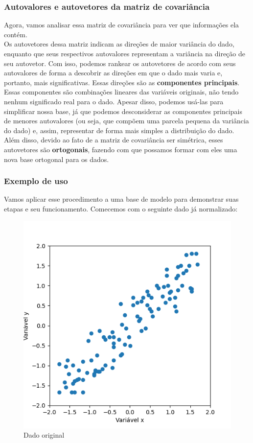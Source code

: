 \documentclass{article}
\begin{document}
\subsubsection{Autovalores e autovetores da matriz de covariância}

Agora, vamos analisar essa matriz de covariância para ver que informações ela contém. \\

Os autovetores dessa matriz indicam as direções de maior variância do dado, enquanto que seus respectivos autovalores representam a variância na direção de seu autovetor. Com isso, podemos rankear os autovetores de acordo com seus autovalores de forma a descobrir as direções em que o dado mais varia e, portanto, mais significativas. Essas direções são as \textbf{componentes principais}. \\

Essas componentes são combinações lineares das variáveis originais, não tendo nenhum significado real para o dado. Apesar disso, podemos usá-las para simplificar nossa base, já que podemos desconsiderar as componentes principais de menores autovalores (ou seja, que compõem uma parcela pequena da variância do dado) e, assim, representar de forma mais simples a distribuição do dado. Além disso, devido ao fato de a matriz de covariância ser simétrica, esses autovetores são \textbf{ortogonais}, fazendo com que possamos formar com eles uma nova base ortogonal para os dados. \\

\subsubsection{Exemplo de uso}

Vamos aplicar esse procedimento a uma base de modelo para demonstrar suas etapas e seu funcionamento. Comecemos com o seguinte dado já normalizado:

\vspace{4cm}

\begin{figure}[h!]
    \centering
    \includegraphics[width=0.4\linewidth]{Figure_3.png}
    \caption{Dado original}
    \label{fig:enter-label}
\end{figure}
\end{document}
